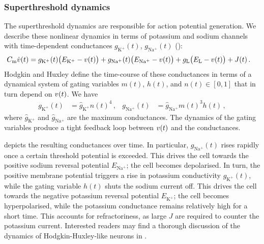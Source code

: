 \subsubsection{Superthreshold dynamics}
The superthreshold dynamics are responsible for action potential generation.
We describe these nonlinear dynamics in terms of potassium and sodium channels with time-dependent conductances $g_\mathrm{K^+}(t)$, $g_\mathrm{Na^+}(t)$ ():
\begin{align*}
	C_\mathrm{m} \dot{{v}}(t) &=
		  g_\mathrm{K^+}(t) \bigl(E_\mathrm{K^+} - {v}(t)\bigr)
		+ g_\mathrm{Na^+}(t) \bigl(E_\mathrm{Na^+} - {v}(t)\bigr)
		+ g_\mathrm{L} \bigl(E_\mathrm{L} - {v}(t)\bigr) + J(t) \,.
\end{align*}
Hodgkin and Huxley define the time-course of these conductances in terms of a dynamical system of gating variables $m(t)$, $h(t)$, and $n(t) \in [0, 1]$ that in turn depend on ${v}(t)$.
We have
\begin{align*}
	g_\mathrm{K^+}(t) &= \hat g_\mathrm{K^+} n(t)^4 \,, &
	g_\mathrm{Na^+}(t) &= \hat g_\mathrm{Na^+} m(t)^3 h(t) \,,
\end{align*}
where $\hat g_\mathrm{K^+}$ and $\hat g_\mathrm{Na^+}$ are the maximum conductances.
The dynamics of the gating variables produce a tight feedback loop between ${v}(t)$ and the conductances.

 depicts the resulting conductances over time.
In particular, $g_\mathrm{Na^+}(t)$ rises rapidly once a certain threshold potential is exceeded.
This drives the cell towards the positive sodium reversal potential $E_\mathrm{Na^+}$; the cell becomes depolarised.
In turn, the positive membrane potential triggers a rise in potassium conductivity $g_\mathrm{K^+}(t)$, while the gating variable $h(t)$ shuts the sodium current off. This drives the cell towards the negative potassium reversal potential $E_\mathrm{K^+}$; the cell becomes hyperpolarised, while the potassium conductance remains relatively high for a short time.
This accounts for refractoriness, as large $J$ are required to counter the potassium current.
Interested readers may find a thorough discussion of the dynamics of Hodgkin-Huxley-like neurons in \citet{izhikevich2007dynamical}.


